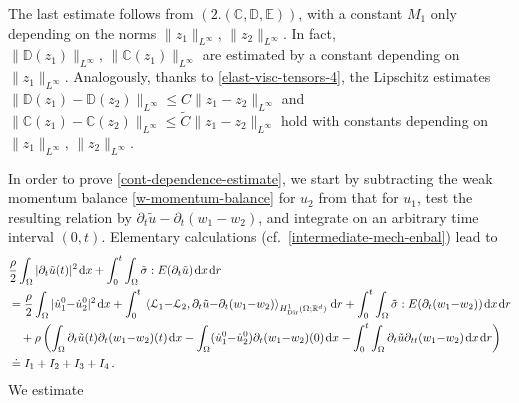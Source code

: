 \documentclass[a4paper,10pt,reqno]{amsart}
\numberwithin{equation}{section}
\newcommand{\R}{\mathbb{R}}
\numberwithin{equation}{section}
\def\dd{\;\!\mathrm{d}} %
\newcommand{\pairing}[4]{ \sideset{_{ #1 }}{_{ #2 }}  {\mathop{\langle #3 , #4
\rangle}}}
\newcommand{\sig}[1]{E(#1)}
\newcommand{\Dir}{\mathrm{Dir}}
\newcommand{\bbC}{\mathbb{C}}
\newcommand{\bbD}{\mathbb{D}}
\newcommand{\bbE}{\mathbb{E}}
\begin{document}
The last estimate follows from $(2.(\bbC,\bbD,\bbE))$, with a constant $M_1$ only depending   on the norms $\|z_1\|_{L^\infty}$, $\|z_2\|_{L^\infty}$.   In fact, 
$\|   \bbD(z_1)\|_{L^\infty},\, \|   \bbC(z_1)\|_{L^\infty}$ are estimated by a constant  depending on $\|z_1\|_{L^\infty}$. Analogously,  thanks to \eqref{elast-visc-tensors-4}, 
the Lipschitz estimates $\| \bbD(z_1){-} \bbD(z_2)\|_{L^\infty} \leq C \| z_1{-}z_2\|_{L^\infty}$ and 
$\| \bbC(z_1){-} \bbC(z_2)\|_{L^\infty} \leq \tilde{C} \| z_1{-}z_2\|_{L^\infty}$ hold with constants depending on  $\|z_1\|_{L^\infty}$, $\|z_2\|_{L^\infty}$. 
\par
In order to prove 
\eqref{cont-dependence-estimate}, we start by subtracting the weak momentum balance \eqref{w-momentum-balance} for $u_2$ from that for $u_1$, test the resulting relation by $\partial_t \tilde{u} -\partial_t (w_1{-}w_2)$, and integrate on an arbitrary time interval $(0,t)$. Elementary calculations (cf.\ \eqref{intermediate-mech-enbal}) lead to
\begin{equation}
\label{est-tilde-u}
\begin{aligned}
& 
\frac{\rho}2 \int_\Omega |\partial_t\tilde{u}(t)|^2 \dd x + \int_0^t \int_\Omega \tilde{\sigma} : \sig{\partial_t\tilde{u}} \dd x \dd r 
\\
&  = \frac{\rho}2 \int_\Omega |\dot{u}_1^0 {-}  \dot{u}_2^0 |^2 \dd x  + \int_0^t \pairing{}{H_\Dir^1 (\Omega;\R^d)}{\mathcal{L}_1 {-} \mathcal{L}_2 }{\partial_t \tilde{u} {-} \partial_t (w_1{-}w_2)} \dd r  +
\int_0^t \int_\Omega  \tilde{\sigma}  : \sig{\partial_t ( w_1{-}w_2)} \dd x \dd r 
\\
&\quad  +\rho \left( \int_\Omega \partial_t\tilde{u}(t) \partial_t(w_1{-}w_2)(t) \dd x -  \int_\Omega (\dot{u}_1^0 {-}  \dot{u}_2^0)  \partial_t(w_1{-}w_2)(0)
\dd x - \int_0^t \int_\Omega \partial_t\tilde{u}\partial_{tt} (w_1{-}w_2) \dd x \dd r \right)
\\
& \doteq I_1+I_2+I_3+I_4\,.
\end{aligned}
\end{equation}
We estimate
\end{document}
